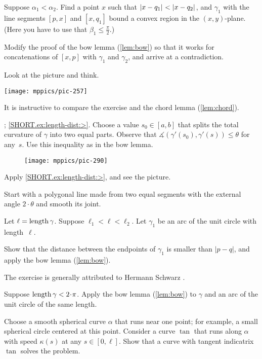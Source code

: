 \begin{multicols}{2}
Suppose $\alpha_1<\alpha_2$.
Find a point $x$ such that 
$\dist{x}{q_1}{}<\dist{x}{q_2}{}$, and
$\gamma_1$ with the line segments $[p,x]$ and $[x,q_1]$ bound a convex region in the $(x,y)$-plane.
(Here you have to use that $\beta_1\le\tfrac\pi2$.)

Modify the proof of the bow lemma (\ref{lem:bow}) so that it works for concatenations of $[x,p]$ with $\gamma_1$ and $\gamma_2$, and arrive at a contradiction.

 Look at the picture and think.

\begin{Figure}
\vskip-0mm
\centering
\texttt{[image: mppics/pic-257]}
\vskip0mm
\end{Figure}

 It is instructive to compare the exercise and the chord lemma (\ref{lem:chord}).

\parbf{\ref{ex:length-dist}}; \ref{SHORT.ex:length-dist:>}.
Choose a value $s_0\in[a,b]$ that splits the total curvature of $\gamma$ into two equal parts.
Observe that $\measuredangle(\gamma'(s_0),\gamma'(s))\le \theta$ for any~$s$.
Use this inequality as in the bow lemma.

\begin{wrapfigure}[4]{r}{23 mm}
\vskip-0mm
\centering
\texttt{[image: mppics/pic-290]}
\vskip-0mm
\end{wrapfigure}

 Apply \ref{SHORT.ex:length-dist:>}, and see the picture.

 Start with a polygonal line made from two equal segments with the external angle $2\cdot\theta$ and smooth its joint. 


Let $\ell=\mathop{\rm length}\nolimits\gamma$.
Suppose $\ell_1<\ell<\ell_2$.
Let $\gamma_1$ be an arc of the unit circle with length~$\ell$.

Show that the distance between the endpoints of $\gamma_1$ is smaller than $|p-q|$, and apply the bow lemma (\ref{lem:bow}).

 The exercise is generally attributed to Hermann Schwarz \cite{shur}.


Suppose $\length\gamma<2\cdot\pi$. 
Apply the bow lemma (\ref{lem:bow}) to $\gamma$ and an arc of the unit circle of the same length.

Choose a smooth spherical curve $\alpha$ that runs near one point;
for example, a small spherical circle centered at this point.
Consider a curve $\tan$ that runs along $\alpha$ with speed $\kappa(s)$ at any $s\in [0,\ell]$.
Show that a curve with tangent indicatrix $\tan$ solves the problem.


\end{multicols}
